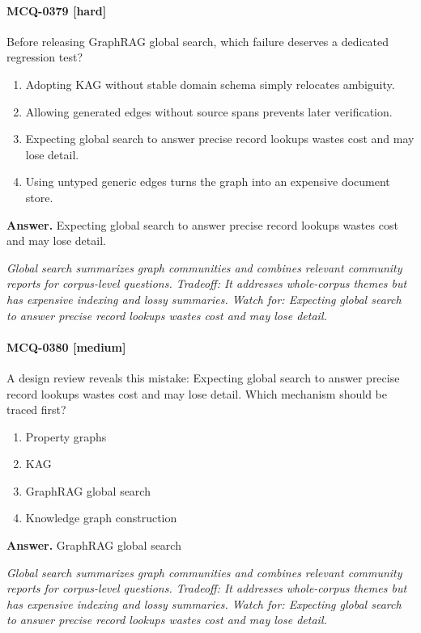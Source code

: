 \paragraph{MCQ-0379 [hard]} Before releasing GraphRAG global search, which failure deserves a dedicated regression test?
\begin{enumerate}[label=\Alph*.]
\item Adopting KAG without stable domain schema simply relocates ambiguity.
\item Allowing generated edges without source spans prevents later verification.
\item Expecting global search to answer precise record lookups wastes cost and may lose detail.
\item Using untyped generic edges turns the graph into an expensive document store.
\end{enumerate}
\noindent\textbf{Answer.} Expecting global search to answer precise record lookups wastes cost and may lose detail.
\par\textit{Global search summarizes graph communities and combines relevant community reports for corpus-level questions. Tradeoff: It addresses whole-corpus themes but has expensive indexing and lossy summaries. Watch for: Expecting global search to answer precise record lookups wastes cost and may lose detail.}
\paragraph{MCQ-0380 [medium]} A design review reveals this mistake: Expecting global search to answer precise record lookups wastes cost and may lose detail. Which mechanism should be traced first?
\begin{enumerate}[label=\Alph*.]
\item Property graphs
\item KAG
\item GraphRAG global search
\item Knowledge graph construction
\end{enumerate}
\noindent\textbf{Answer.} GraphRAG global search
\par\textit{Global search summarizes graph communities and combines relevant community reports for corpus-level questions. Tradeoff: It addresses whole-corpus themes but has expensive indexing and lossy summaries. Watch for: Expecting global search to answer precise record lookups wastes cost and may lose detail.}
